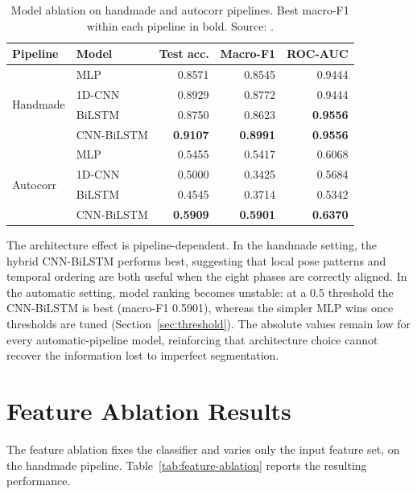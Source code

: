 \begin{table}[htbp]
\centering
\caption[Model ablation on handmade and autocorr pipelines. Source: \protect{}.]{Model ablation on handmade and autocorr pipelines. Best macro-F1 within each pipeline in bold. Source: .}
\label{tab:model-ablation}
\small
\begin{tabular}{llrrr}
\toprule
Pipeline & Model & Test acc. & Macro-F1 & ROC-AUC \\
\midrule
\multirow{4}{*}{Handmade}
& MLP & 0.8571 & 0.8545 & 0.9444 \\
& 1D-CNN & 0.8929 & 0.8772 & 0.9444 \\
& BiLSTM & 0.8750 & 0.8623 & \textbf{0.9556} \\
& CNN-BiLSTM & \textbf{0.9107} & \textbf{0.8991} & \textbf{0.9556} \\
\midrule
\multirow{4}{*}{Autocorr}
& MLP & 0.5455 & 0.5417 & 0.6068 \\
& 1D-CNN & 0.5000 & 0.3425 & 0.5684 \\
& BiLSTM & 0.4545 & 0.3714 & 0.5342 \\
& CNN-BiLSTM & \textbf{0.5909} & \textbf{0.5901} & \textbf{0.6370} \\
\bottomrule
\end{tabular}
\end{table}

The architecture effect is pipeline-dependent. In the handmade setting, the
hybrid CNN-BiLSTM performs best, suggesting that local pose patterns and
temporal ordering are both useful when the eight phases are correctly aligned.
In the automatic setting, model ranking becomes unstable: at a 0.5 threshold the CNN-BiLSTM is best (macro-F1 0.5901), whereas the
simpler MLP wins once thresholds are tuned (Section~\ref{sec:threshold}). The
absolute values remain low for every automatic-pipeline model, reinforcing
that architecture choice cannot recover the information lost to imperfect
segmentation.

\section{Feature Ablation Results}
\label{sec:feature-ablation}

The feature ablation fixes the classifier and varies only the input feature
set, on the handmade pipeline. Table~\ref{tab:feature-ablation} reports the
resulting performance.


